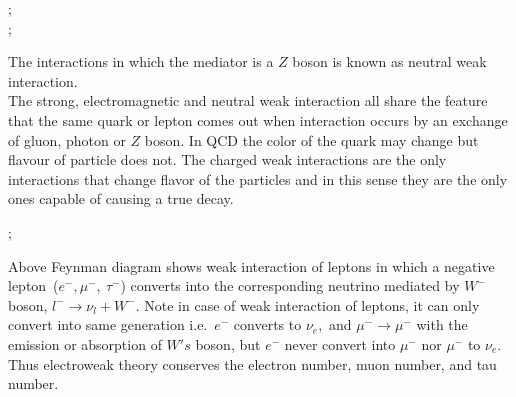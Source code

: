 \begin{center}
;\\

;
\end{center}
The interactions in which the mediator is a $Z$ boson is known as neutral weak interaction.\\
The strong, electromagnetic and neutral weak interaction all share the feature that the same quark or lepton comes out when interaction occurs by an exchange of gluon, photon or $Z$ boson. In QCD the color of the quark may change but flavour of particle does not. The charged weak interactions are the only interactions that change flavor of the particles and in this sense they are the only ones capable of causing a true decay.

\begin{center}

;
\end{center}

Above Feynman diagram shows weak interaction of leptons in which a negative lepton~($e^{-}, \mu^{-},~\tau^{-}$) converts into the corresponding neutrino mediated by $W^{-}$ boson, $l^{-}\rightarrow\nu_{l}+W^{-}$.
Note in case of weak interaction of leptons, it can only convert into same generation i.e.~$e^{-}$ converts to $\nu_{e},$ and $\mu^{-}\rightarrow\mu^{-}$ with the emission or absorption of $W's$ boson, but $e^{-}$ never convert
into $\mu^{-}$ nor $\mu^{-}$ to $\nu_{e}$. Thus electroweak theory conserves the electron number, muon number, and tau number.

